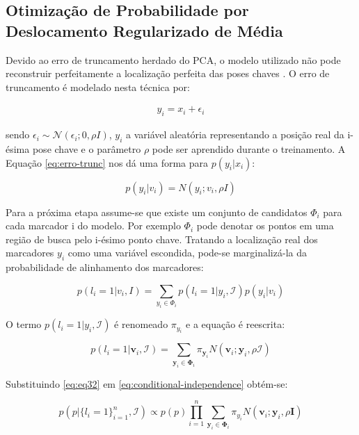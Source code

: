 {\subsection{Otimização de Probabilidade por Deslocamento Regularizado de Média}

Devido ao erro de truncamento herdado do PCA, o modelo utilizado não pode
reconstruir perfeitamente a localização perfeita das poses chaves
\cite{saragih2011deformable}. O erro de truncamento é modelado nesta técnica
por:

\begin{align}
y_i = x_i + \epsilon_i
\label{eq:erro-trunc}
\end{align}

sendo $\epsilon_i \sim \mathcal{N}(\epsilon_i; 0, \rho I)$, $y_i$ a variável
aleatória representando a posição real da i-ésima pose chave e o parâmetro
$\rho$ pode ser aprendido durante o treinamento. A Equação \ref{eq:erro-trunc}
nos dá uma forma para $p(y_i | x_i)$:

\begin{equation}
p(y_i | v_i) = N(y_i; v_i, \rho I)
\end{equation}

Para a próxima etapa assume-se que existe um conjunto de candidatos $\Phi_i$
para cada marcador i do modelo. Por exemplo $\Phi_i$ pode denotar os pontos em
uma região de busca pelo i-ésimo ponto chave. Tratando a localização real dos
marcadores $y_i$ como uma variável escondida, pode-se marginalizá-la da
probabilidade de alinhamento dos marcadores:

\begin{equation}
p(l_i = 1|v_i, I) = \sum_{y_i \in \Phi_i} p(l_i = 1| y_i, \mathcal{I})p(y_i|v_i)
\end{equation}

O termo $p(l_i = 1| y_i, \mathcal{I})$ é renomeado $\pi_{y_i}$ e a equação é reescrita:

\begin{equation}
\label{eq:eq32}
p(l_i = 1|\mathbf{v}_i, \mathcal{I}) = \sum_{\mathbf{y}_i \in \mathbf{\Phi}_i} \pi_{\mathbf{y}_i} N(\mathbf{v}_i; \mathbf{y}_i, \rho \mathcal{I})
\end{equation}

Substituindo \ref{eq:eq32} em \ref{eq:conditional-independence}
 obtém-se:

\begin{equation}
p(p|\{l_i=1\}_{i=1}^n, \mathcal{I}) \varpropto p(p) \prod_{i=1}^n \sum_{\mathbf{y}_i \in \mathbf{\Phi}_i}
\pi_{y_i} N(\mathbf{v}_i; \mathbf{y}_i, \rho \mathbf{I})
\label{eq:eq23}
\end{equation}

}
